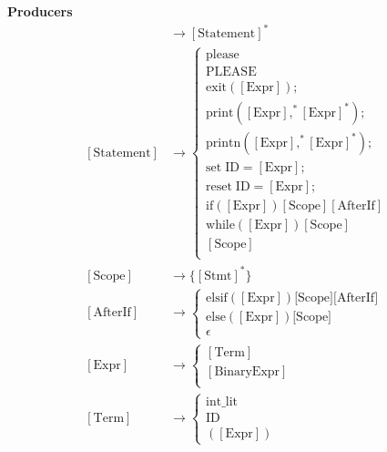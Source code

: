 \documentclass[11pt]{article}
\begin{document}
\textbf{Producers}
\begin{align*}
  [\text{Program}] &\to [\text{Statement}]^* \\
  [\text{Statement}] &\to 
  \begin{cases}
    \text{please} \\
    \text{PLEASE} \\
    \text{exit}([\text{Expr}]); \\ 
    \text{print}([\text{Expr}] ,^* [\text{Expr}]^*); \\ 
    \text{printn}([\text{Expr}] ,^* [\text{Expr}]^*); \\ 
    \text{set} \; \text{ID} = [\text{Expr}]; \\
    \text{reset} \; \text{ID} = [\text{Expr}]; \\
    \text{if} ([\text{Expr}])[\text{Scope}][\text{AfterIf}]  \\
    \text{while} ([\text{Expr}])[\text{Scope}] \\
    [\text{Scope}] \\
  \end{cases} \\
  [\text{Scope}] &\to \{[\text{Stmt}]^*\} \\
  [\text{AfterIf}] &\to 
  \begin{cases}
    \text{elsif}([\text{Expr}])\text{[Scope]}\text{[AfterIf]} \\
    \text{else}([\text{Expr}])\text{[Scope]} \\
    \epsilon
  \end{cases} \\
  [\text{Expr}] &\to 
  \begin{cases}
  [\text{Term}] \\ 
  [\text{BinaryExpr}] \\
  \end{cases} \\
  [\text{Term}] &\to
  \begin{cases}
    \text{int\_lit} \\ 
    \text{ID} \\ 
    \left([\text{Expr}]\right)
  \end{cases} \\
\end{align*}
\end{document}
